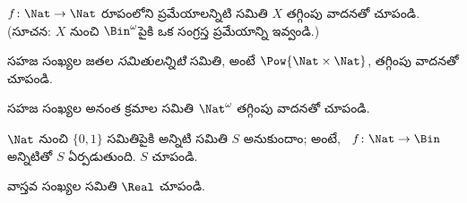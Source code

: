 \documentclass[../../../include/open-logic-section]{subfiles}
\begin{document}
\begin{prob}\label{sfr:siz:red:prob:nat-nat}
  $f\colon \Nat \to \Nat$ రూపంలోని ప్రమేయాలన్నిటి సమితి $X$
   తగ్గింపు వాదనతో చూపండి. (సూచన: $X$ నుంచి
  $\Bin^\omega$పైకి ఒక సంగ్రస్త ప్రమేయాన్ని ఇవ్వండి.)
\end{prob}

\begin{prob}
సహజ సంఖ్యల జతల \emph{సమితులన్నిటి} సమితి, అంటే
$\Pow{\Nat \times \Nat}$,  తగ్గింపు వాదనతో చూపండి.
\end{prob}

\begin{prob}
సహజ సంఖ్యల అనంత క్రమాల సమితి $\Nat^\omega$ 
తగ్గింపు వాదనతో చూపండి.
\end{prob}


\begin{prob}
$\Nat$ నుంచి $\{0,1\}$ సమితిపైకి  అన్నిటి సమితి $S$
అనుకుందాం; అంటే, ~$f \colon \Nat \to \Bin$
అన్నిటితో $S$ ఏర్పడుతుంది. $S$  చూపండి.
\end{prob}

\begin{prob}
వాస్తవ సంఖ్యల సమితి $\Real$  చూపండి.
\end{prob}
\end{document}
